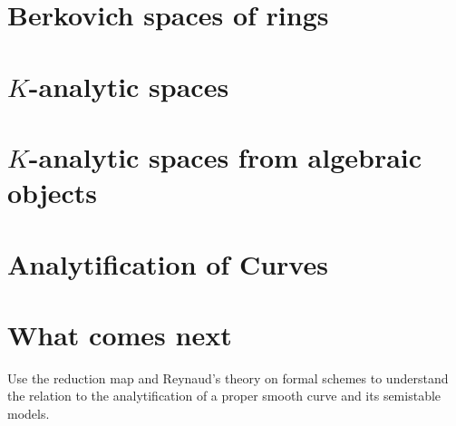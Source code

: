 \documentclass[a4paper]{article}
\begin{document}


\section{Berkovich spaces of rings} \label{sec:berkovich_spaces}



\section{$K$-analytic spaces} \label{sec:K_analytic_spaces}



\section{$K$-analytic spaces from algebraic objects} \label{sec:berkovich_analytification_of_schemes}



\section{Analytification of Curves} \label{sec:analytification_of_curves}



\section{What comes next} \label{sec:what_comes_next}

Use the reduction map and Reynaud's theory on formal schemes to understand the relation to the analytification of a proper smooth curve and its semistable models. 


\pagebreak
\printbibliography
\end{document}
